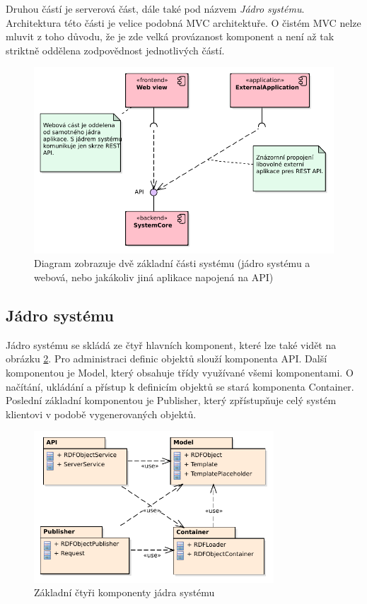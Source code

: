 \documentclass[thesis=B,czech]{FITthesis}[2012/06/26]
\begin{document}
  Druhou částí je serverová část, dále také pod názvem \textit{Jádro systému}. Architektura této části je velice podobná MVC architektuře. O čistém MVC nelze 
  mluvit z toho důvodu, že je zde velká provázanost komponent a není až tak striktně oddělena zodpovědnost jednotlivých částí.
  
  \begin{figure}\centering
 	\includegraphics[width=1\textwidth]{Component_Model.pdf}
 	\caption[Základní části systému]{Diagram zobrazuje dvě základní části systému (jádro systému a webová, nebo jakákoliv jiná aplikace napojená na API)}\label{parts}
 \end{figure}
  
  \subsection{Jádro systému}  
  Jádro systému se skládá ze čtyř hlavních komponent, které lze také vidět na obrázku \ref{packages_core}. Pro administraci definic objektů slouží komponenta API. Další komponentou je Model, který obsahuje
  třídy využívané všemi komponentami. O načítání, ukládání a přístup k definicím objektů se stará komponenta Container.
  Poslední základní komponentou je Publisher, který zpřístupňuje celý systém klientovi v podobě vygenerovaných objektů.
  
  
  \begin{figure}\centering
 	\includegraphics[width=0.8\textwidth]{Components.pdf}
 	\caption[Model komponent]{Základní čtyři komponenty jádra systému}\label{packages_core}
 \end{figure}
  
\end{document}
